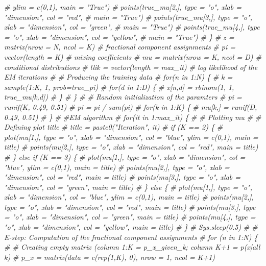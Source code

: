 \documentclass[]{article}
\newenvironment{Shaded}{\begin{snugshade}}{\end{snugshade}}
\newcommand{\CommentTok}[1]{\textcolor[rgb]{0.56,0.35,0.01}{\textit{#1}}}
\begin{document}
\begin{Shaded}
\begin{Highlighting}[]
\CommentTok{# ylim = c(0,1), main = "True")}
\CommentTok{# points(true_mu[2,], type = "o", xlab = "dimension", col = "red",}
\CommentTok{# main = "True")}
\CommentTok{# points(true_mu[3,], type = "o", xlab = "dimension", col = "green",}
\CommentTok{# main = "True")}
\CommentTok{# points(true_mu[4,], type = "o", xlab = "dimension", col = "yellow",}
\CommentTok{# main = "True")}
\CommentTok{# \}}
\CommentTok{# z = matrix(nrow = N, ncol = K) # fractional component assignments}
\CommentTok{# pi = vector(length = K) # mixing coefficients}
\CommentTok{# mu = matrix(nrow = K, ncol = D) # conditional distributions}
\CommentTok{# llik = vector(length = max_it) # log likelihood of the EM iterations}
\CommentTok{# # Producing the training data}
\CommentTok{# for(n in 1:N) \{}
\CommentTok{# k = sample(1:K, 1, prob=true_pi)}
\CommentTok{# for(d in 1:D) \{}
\CommentTok{# x[n,d] = rbinom(1, 1, true_mu[k,d])}
\CommentTok{# \}}
\CommentTok{# \}}
\CommentTok{# # Random initialization of the paramters}
\CommentTok{# pi = runif(K, 0.49, 0.51)}
\CommentTok{# pi = pi / sum(pi)}
\CommentTok{# for(k in 1:K) \{}
\CommentTok{# mu[k,] = runif(D, 0.49, 0.51)}
\CommentTok{# \}}
\CommentTok{# #EM algorithm}
\CommentTok{# for(it in 1:max_it) \{}
\CommentTok{# # Plotting mu}
\CommentTok{# # Defining plot title}
\CommentTok{# title = paste0("Iteration", it)}
\CommentTok{# if (K == 2) \{}
\CommentTok{# plot(mu[1,], type = "o", xlab = "dimension", col = "blue", ylim = c(0,1), main = title)}
\CommentTok{# points(mu[2,], type = "o", xlab = "dimension", col = "red", main = title)}
\CommentTok{# \} else if (K == 3) \{}
\CommentTok{# plot(mu[1,], type = "o", xlab = "dimension", col = "blue", ylim = c(0,1), main = title)}
\CommentTok{# points(mu[2,], type = "o", xlab = "dimension", col = "red", main = title)}
\CommentTok{# points(mu[3,], type = "o", xlab = "dimension", col = "green", main = title)}
\CommentTok{# \} else \{}
\CommentTok{# plot(mu[1,], type = "o", xlab = "dimension", col = "blue", ylim = c(0,1), main = title)}
\CommentTok{# points(mu[2,], type = "o", xlab = "dimension", col = "red", main = title)}
\CommentTok{# points(mu[3,], type = "o", xlab = "dimension", col = "green", main = title)}
\CommentTok{# points(mu[4,], type = "o", xlab = "dimension", col = "yellow", main = title)}
\CommentTok{# \}}
\CommentTok{# Sys.sleep(0.5)}
\CommentTok{# # E-step: Computation of the fractional component assignments}
\CommentTok{# for (n in 1:N) \{}
\CommentTok{# # Creating empty matrix (column 1:K = p_x_given_k; column K+1 = p(x|all k)}
\CommentTok{# p_x = matrix(data = c(rep(1,K), 0), nrow = 1, ncol = K+1)}

\end{Highlighting}
\end{Shaded}
\end{document}
